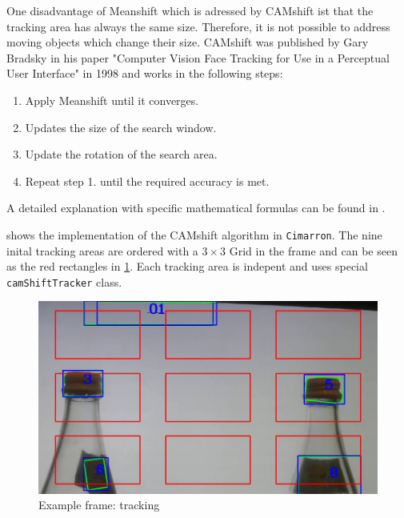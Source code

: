 One disadvantage of Meanshift which is adressed by CAMshift ist that the tracking area has always the same size. Therefore, it is not possible to address moving objects which change their size. CAMshift was published by Gary Bradsky in his paper "Computer Vision Face Tracking for Use in a Perceptual User Interface" in 1998 and works in the following steps:
\begin{enumerate}
    \item Apply Meanshift until it converges.
    \item Updates the size of the search window.
    \item Update the rotation of the search area.
    \item Repeat step 1. until the required accuracy is met.
\end{enumerate}

A detailed explanation with specific mathematical formulas can be found in \cite{Bradski98computervision}.

\begin{figure}[ht!]\centering
\end{figure}

 shows the implementation of the CAMshift algorithm in \texttt{Cimarron}. The nine inital tracking areas are ordered with a $3\times 3$ Grid in the frame and can be seen as the red rectangles in \cref{fig:example:cam}. Each tracking area is indepent and uses special \texttt{camShiftTracker} class.

\begin{figure}\centering
    \includegraphics[scale=0.35]{images/tracking-example.jpg}
    \caption{Example frame: tracking}
    \label{fig:example:cam}
\end{figure}


